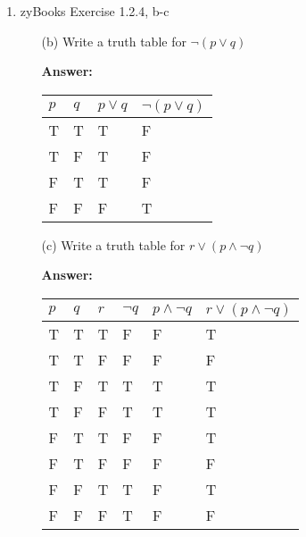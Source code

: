 \documentclass[12pt]{extreport}
\newcommand{\answer}[0]{\medskip \textbf{Answer:} \medskip}
\begin{document}
\begin{enumerate}
    
    \item zyBooks Exercise 1.2.4, b-c
    
        \begin{enumerate}

            \item[(b)] Write a truth table for \( \neg(p \lor q) \)
            
                \answer

                \begin{tabular}{|l|l|l|l|}
                    \hline
                    \( p \) & \( q \) & \( p \lor q \) & \( \neg(p \lor q) \) \\ \hline
                    T & T & T & F \\ \hline
                    T & F & T & F \\ \hline
                    F & T & T & F \\ \hline
                    F & F & F & T \\ \hline
                \end{tabular}
    
            \item[(c)] Write a truth table for \( r \lor (p \land \neg q) \)
        
                \answer
        
                \begin{tabular}{|l|l|l|l|l|l|}
                    \hline
                    \( p \) & \( q \) & \( r \) & \( \neg q \) & \( p \land \neg q\) & \( r \lor (p \land \neg q) \) \\ 
                    \hline
                    T & T & T & F & F & T \\ \hline
                    T & T & F & F & F & F \\ \hline
                    T & F & T & T & T & T \\ \hline
                    T & F & F & T & T & T \\ \hline
                    F & T & T & F & F & T \\ \hline
                    F & T & F & F & F & F \\ \hline
                    F & F & T & T & F & T \\ \hline
                    F & F & F & T & F & F \\ \hline
                \end{tabular}
    

\end{enumerate}
\end{enumerate}
\end{document}
